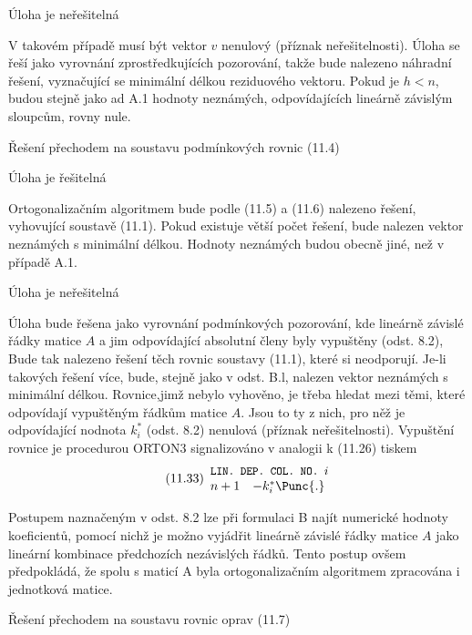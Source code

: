   Úloha je neřešitelná

V takovém případě musí být vektor $v$ nenulový (příznak
neřešitelnosti). Úloha se řeší jako vyrovnání zprostředkujících
pozorování, takže bude nalezeno náhradní řešení, vyznačující se
minimální délkou reziduového vektoru. Pokud je $h< n$, budou stejně
jako ad A.1 hodnoty neznámých, odpovídajících lineárně závislým
sloupcům, rovny nule.


 Řešení přechodem na soustavu podmínkových rovnic (11.4)

 Úloha je řešitelná

Ortogonalizačním algoritmem bude podle (11.5) a (11.6)
nalezeno řešení, vyhovující soustavě (11.1). Pokud existuje větší
počet řešení, bude nalezen vektor neznámých s minimální délkou.
%
Hodnoty  neznámých budou obecně jiné, než v případě A.1.

 Úloha je neřešitelná

Úloha bude řešena jako vyrovnání podmínkových pozorování,
kde lineárně závislé řádky matice $A$ a jim odpovídající
absolutní členy byly vypuštěny (odst. 8.2), Bude tak nalezeno
řešení těch rovnic soustavy (11.1), které si neodporují. Je-li
takových řešení více, bude, stejně jako v odst. B.l, nalezen
vektor neznámých s minimální délkou. Rovnice,jimž nebylo
vyhověno, je třeba hledat mezi těmi, které odpovídají
vypuštěným řádkům matice $A$. Jsou to ty z nich, pro něž je odpovídající
nodnota $k_i^*$ (odst. 8.2) nenulová (příznak neřešitelnosti).
Vypuštění rovnice je procedurou ORTON3 signalizováno v analogii
k (11.26) tiskem
%
\begin{align*}
  \tag{11.33}
    \begin{array}{cl}
  \multicolumn{2}{l}{\small\texttt{LIN. DEP. COL. NO. $i$}} \\
  n+1 & -k_i^*\Punc{.} \\
  \end{array}
\end{align*}

Postupem naznačeným v odst. 8.2 lze při formulaci B najít
numerické hodnoty koeficientů, pomocí nichž je možno vyjádřit
lineárně závislé řádky matice $A$ jako lineární kombinace
předchozích nezávislých řádků. Tento postup ovšem předpokládá, že
spolu s maticí A byla ortogonalizačním algoritmem zpracována i
jednotková matice.




 Řešení přechodem na soustavu rovnic oprav (11.7)

